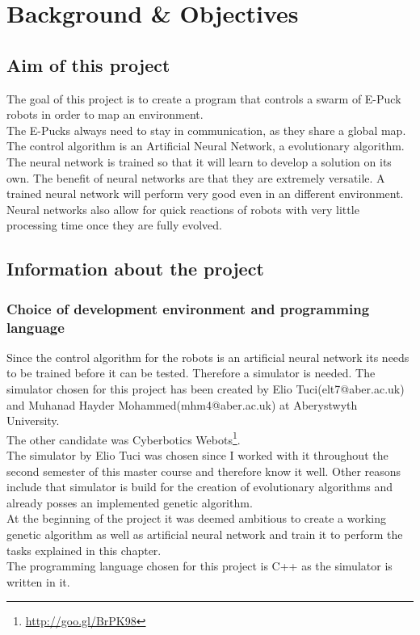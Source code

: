 \chapter{Background \& Objectives}


\section{Aim of this project}
The goal of this project is to create a program that controls a swarm of E-Puck robots in order to map an environment. \\
The E-Pucks always need to stay in communication, as they share a global map. \\
The control algorithm is an Artificial Neural Network, a evolutionary algorithm. \\
The neural network is trained so that it will learn to develop a solution on its own.
The benefit of neural networks are that they are extremely versatile. A trained neural network will perform very good even in an different environment. Neural networks also allow for quick reactions of robots with very little processing time once they are fully evolved.  

\section{Information about the project}
\subsection{Choice of development environment and programming language}
Since the control algorithm for the robots is an artificial neural network its needs to be trained before it can be tested. Therefore a simulator is needed.
The simulator chosen for this project has been created by Elio Tuci(elt7@aber.ac.uk) and Muhanad Hayder Mohammed(mhm4@aber.ac.uk) at Aberystwyth University. \\
The other candidate was Cyberbotics Webots\footnote{\url{http://goo.gl/BrPK98}}. \\
The simulator by Elio Tuci was chosen since I worked with it throughout the second semester of this master course and therefore know it well. Other reasons include that simulator is build for the creation of evolutionary algorithms and already posses an implemented genetic algorithm. \\
At the beginning of the project it was deemed ambitious to create a working genetic algorithm as well as artificial neural network and train it to perform the tasks explained in this chapter. \\
The programming language chosen for this project is C++ as the simulator is written in it. 

